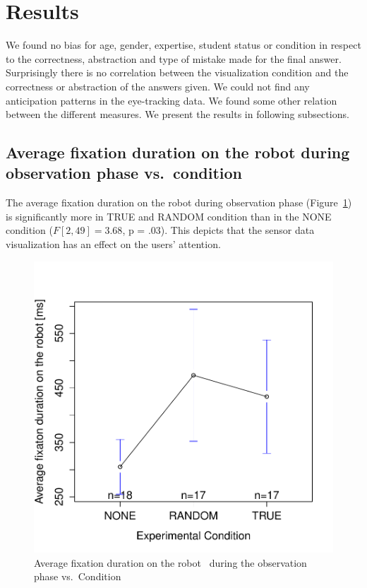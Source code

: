 \documentclass{sig-alternate}
\begin{document}

\section{Results}

We found no bias for age, gender, expertise, student status or condition
in respect to the correctness, abstraction and type of mistake made for
the final answer. Surprisingly there is no correlation between the
visualization condition and the correctness or abstraction of the
answers given. We could not find any anticipation patterns in the
eye-tracking data. We found some other relation between the different
measures. We present the results in following subsections.

\subsection{Average fixation duration on the robot during observation phase
vs.~condition}

The average fixation duration on the robot during observation phase
(Figure~\ref{res1}) is significantly more in TRUE and RANDOM condition than in
the NONE condition ($F[2,49]=3.68$, p = .03). This depicts that the
sensor data visualization has an effect on the users' attention.

\begin{figure}[h!]
    \centering
    \includegraphics[width=0.8\linewidth]{meanPlotFixRobo}
    \caption{Average fixation duration on the robot ~during the observation phase
    vs.~Condition}
    \label{res1}
\end{figure}
\end{document}
